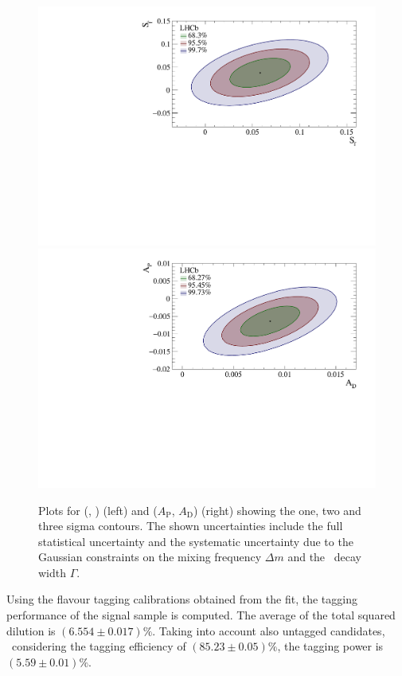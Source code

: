 \begin{figure}[t]
        \begin{center}
            \includegraphics[width=0.48\linewidth]{05DecaytimeFit/figs/datafit/SfvsSfbar.pdf}
            \includegraphics[width=0.48\linewidth]{05DecaytimeFit/figs/datafit/ADvsAP.pdf}
        \end{center}
        \vspace{-2mm}
        \caption{Plots for (\Sf, \Sfb) (left) and ($A_\mathrm{P}$, $A_\mathrm{D}$) (right) showing the one, two and three sigma contours.
        The shown uncertainties include the full statistical uncertainty and the systematic uncertainty due to the Gaussian constraints on
        the mixing frequency $\Delta m$ and the \Bz~decay width $\Gamma$.}
        \label{fig:timefitcCPcontour}
\end{figure}

Using the flavour tagging calibrations obtained from the fit, the tagging performance of the signal sample is computed.
The average of the total squared dilution is $(6.554\pm0.017)\%$. Taking
into account also untagged candidates, \ie~considering the tagging efficiency of $(85.23\pm0.05)\%$, the tagging power is $(5.59\pm0.01)\%$.
